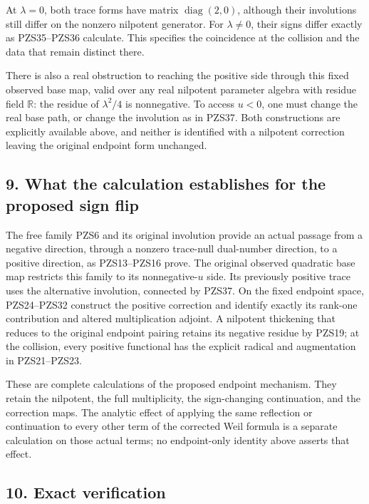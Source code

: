 \documentclass[
  10pt,
  a4paper,
]{article}
\begin{document}
At \(\lambda=0\), both trace forms have matrix
\(\operatorname{diag}(2,0)\), although their involutions still differ on
the nonzero nilpotent generator. For \(\lambda\ne0\), their signs differ
exactly as PZS35--PZS36 calculate. This specifies the coincidence at the
collision and the data that remain distinct there.

There is also a real obstruction to reaching the positive side through
this fixed observed base map, valid over any real nilpotent parameter
algebra with residue field \(\mathbb R\): the residue of \(\lambda^2/4\)
is nonnegative. To access \(u<0\), one must change the real base path,
or change the involution as in PZS37. Both constructions are explicitly
available above, and neither is identified with a nilpotent correction
leaving the original endpoint form unchanged.

\subsection{9. What the calculation establishes for the proposed sign
flip}\label{what-the-calculation-establishes-for-the-proposed-sign-flip}

The free family PZS6 and its original involution provide an actual
passage from a negative direction, through a nonzero trace-null
dual-number direction, to a positive direction, as PZS13--PZS16 prove.
The original observed quadratic base map restricts this family to its
nonnegative-\(u\) side. Its previously positive trace uses the
alternative involution, connected by PZS37. On the fixed endpoint space,
PZS24--PZS32 construct the positive correction and identify exactly its
rank-one contribution and altered multiplication adjoint. A nilpotent
thickening that reduces to the original endpoint pairing retains its
negative residue by PZS19; at the collision, every positive functional
has the explicit radical and augmentation in PZS21--PZS23.

These are complete calculations of the proposed endpoint mechanism. They
retain the nilpotent, the full multiplicity, the sign-changing
continuation, and the correction maps. The analytic effect of applying
the same reflection or continuation to every other term of the corrected
Weil formula is a separate calculation on those actual terms; no
endpoint-only identity above asserts that effect.

\subsection{10. Exact verification}\label{exact-verification}
\end{document}
